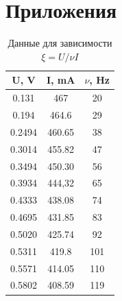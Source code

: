 \documentclass[a4paper, 12pt]{article}
\begin{document}
\section{Приложения}
\begin{table}[H]
	\centering
	\begin{tabular}{|c|c|c|}
	\hline
	U, V   & I, mA  & $\nu$, Hz \\ \hline
	0.131  & 467    & 20     \\ \hline
	0.194  & 464.6  & 29     \\ \hline
	0.2494 & 460.65 & 38     \\ \hline
	0.3014 & 455.82 & 47     \\ \hline
	0.3494 & 450.30 & 56     \\ \hline
	0.3934 & 444,32 & 65     \\ \hline
	0.4333 & 438.08 & 74     \\ \hline
	0.4695 & 431.85 & 83     \\ \hline
	0.5020 & 425.74 & 92     \\ \hline
	0.5311 & 419.8  & 101    \\ \hline
	0.5571 & 414.05 & 110    \\ \hline
	0.5802 & 408.59 & 119    \\ \hline
	\end{tabular}
	\caption{Данные для зависимости $\xi = U/\nu I $}
	\label{tab:1}
	\end{table}
\end{document}
